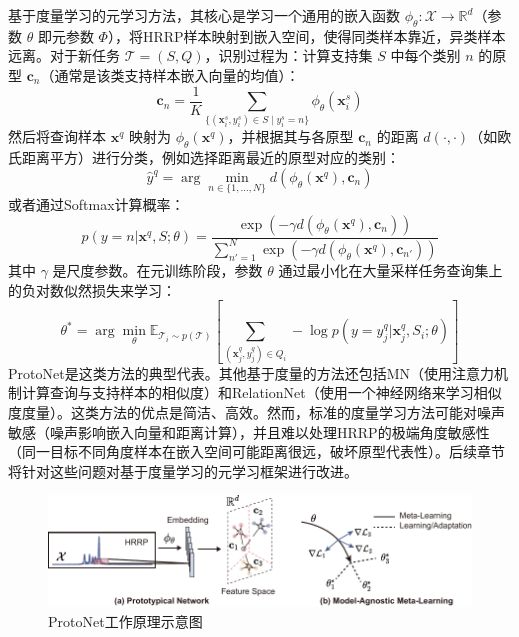 基于度量学习的元学习方法，其核心是学习一个通用的嵌入函数 $\phi_\theta: \mathcal{X} \rightarrow \mathbb{R}^d$（参数 $\theta$ 即元参数 $\Phi$），将HRRP样本映射到嵌入空间，使得同类样本靠近，异类样本远离。对于新任务 $\mathcal{T}=(S, Q)$，识别过程为：计算支持集 $S$ 中每个类别 $n$ 的原型 $\mathbf{c}_n$（通常是该类支持样本嵌入向量的均值）：
\begin{equation}
    \mathbf{c}_n = \frac{1}{K} \sum_{\{(\mathbf{x}_i^s, y_i^s) \in S \mid y_i^s=n\}} \phi_\theta(\mathbf{x}_i^s)
    \label{eq:prototype_calculation}
\end{equation}
然后将查询样本 $\mathbf{x}^q$ 映射为 $\phi_\theta(\mathbf{x}^q)$，并根据其与各原型 $\mathbf{c}_n$ 的距离 $d(\cdot, \cdot)$（如欧氏距离平方）进行分类，例如选择距离最近的原型对应的类别：
\begin{equation}
    \hat{y}^q = \arg\min_{n \in \{1, \dots, N\}} d(\phi_\theta(\mathbf{x}^q), \mathbf{c}_n)
    \label{eq:protonet_prediction_argmin}
\end{equation}
或者通过Softmax计算概率：
\begin{equation}
    p(y=n | \mathbf{x}^q, S; \theta) = \frac{\exp(-\gamma d(\phi_\theta(\mathbf{x}^q), \mathbf{c}_n))}{\sum_{n'=1}^{N} \exp(-\gamma d(\phi_\theta(\mathbf{x}^q), \mathbf{c}_{n'}))}
    \label{eq:protonet_prediction_softmax_gamma} %
\end{equation}
其中 $\gamma$ 是尺度参数。在元训练阶段，参数 $\theta$ 通过最小化在大量采样任务查询集上的负对数似然损失来学习：
\begin{equation}
    \theta^* = \arg\min_{\theta} \mathbb{E}_{\mathcal{T}_i \sim p(\mathcal{T})} \left[ \sum_{(\mathbf{x}_j^q, y_j^q) \in Q_i} -\log p(y=y_j^q | \mathbf{x}_j^q, S_i; \theta) \right]
    \label{eq:protonet_meta_objective}
\end{equation}
ProtoNet是这类方法的典型代表。其他基于度量的方法还包括MN（使用注意力机制计算查询与支持样本的相似度）和RelationNet（使用一个神经网络来学习相似度度量）。这类方法的优点是简洁、高效。然而，标准的度量学习方法可能对噪声敏感（噪声影响嵌入向量和距离计算），并且难以处理HRRP的极端角度敏感性（同一目标不同角度样本在嵌入空间可能距离很远，破坏原型代表性）。后续章节将针对这些问题对基于度量学习的元学习框架进行改进。

\begin{figure}[h]
    \centering
    \includegraphics[width=\linewidth]{figures/proto_maml.pdf}
    \caption{ProtoNet工作原理示意图}
    \label{fig:protonet}
\end{figure}


